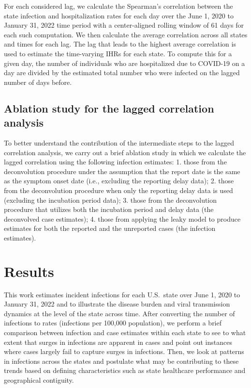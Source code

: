 \documentclass{article}
\begin{document}
For each considered lag, we calculate the Spearman's correlation between the 
state infection and hospitalization rates for each day over the June 1, 2020 
to January 31, 2022
time period%
with a center-aligned rolling window of 61 days for each such computation.
We then calculate the average correlation across all states and times for each lag. 
The lag that leads to the highest average correlation is used to estimate 
the time-varying IHRs for each
state. To compute this for a given day, the number of individuals who are
hospitalized due to COVID-19 on a day are divided by the estimated total number
who were infected on the lagged number of days before.

\subsection{Ablation study for the lagged correlation analysis} 

To better understand the contribution of the intermediate steps to the lagged 
correlation analysis, we carry out a brief ablation study in which we calculate the 
lagged correlation using the following infection estimates: 1. those from the
deconvolution procedure under the assumption that the report date is the 
same as the symptom onset date (i.e., excluding
the reporting delay data); 2. those from the deconvolution procedure when only the
reporting delay data is used (excluding the incubation period data); 3. those from
the deconvolution procedure that utilizes both the incubation period and delay data 
(the deconvolved case estimates); 4. those from applying the leaky model to produce
estimates for both the reported and the unreported cases (the infection estimates).

\section{Results}

This work estimates incident infections for each U.S.\ state over June 1,
2020 to January 31, 2022 and to illustrate the disease burden and viral
transmission dynamics at the level of the state across time. After converting the number
of infections to rates (infections per 100,000 population), we perform a
brief comparison between infection and case estimates within each state to see
to what extent that surges in infections are apparent in cases
and point out instances where cases largely fail to capture surges in infections.
Then, we look at patterns in infections across the states and postulate what may be 
contributing to these trends based on defining characteristics such as state 
healthcare performance and geographical contiguity. 
\end{document}

